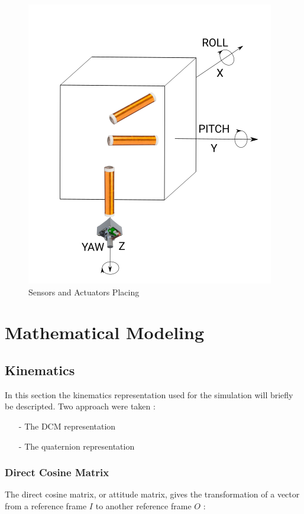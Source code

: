 \documentclass[11pt,a4paper]{report}
\begin{document}
\begin{figure}[H]
 	\centering
 	\includegraphics[scale=0.4]{gfx/actuators.png}
    \caption{Sensors and Actuators Placing}
\end{figure}

\chapter{Mathematical Modeling}

\section{Kinematics}
In this section the kinematics representation used for the simulation will briefly be descripted. Two approach were taken : 
\begin{itemize}
 \item [-] The DCM representation
 \item [-] The quaternion representation
\end{itemize}

\subsection{Direct Cosine Matrix}
The direct cosine matrix, or attitude matrix, gives the transformation of a vector from a reference frame $I$ to another reference frame $O$ : 
\end{document}
